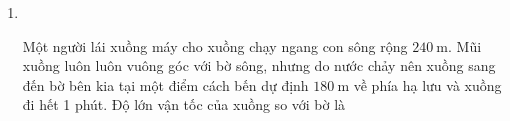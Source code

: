 \begin{enumerate}[label=\bfseries Câu \arabic*:]
\item {}\\
{Một người lái xuồng máy cho xuồng chạy ngang con sông rộng $\SI{240}{\meter}$. Mũi xuồng luôn luôn vuông góc với bờ sông, nhưng do nước chảy nên xuồng sang đến bờ bên kia tại một điểm cách bến dự định $\SI{180}{\meter}$ về phía hạ lưu và xuồng đi hết 1 phút. Độ lớn vận tốc của xuồng so với bờ là
}
\end{enumerate}

